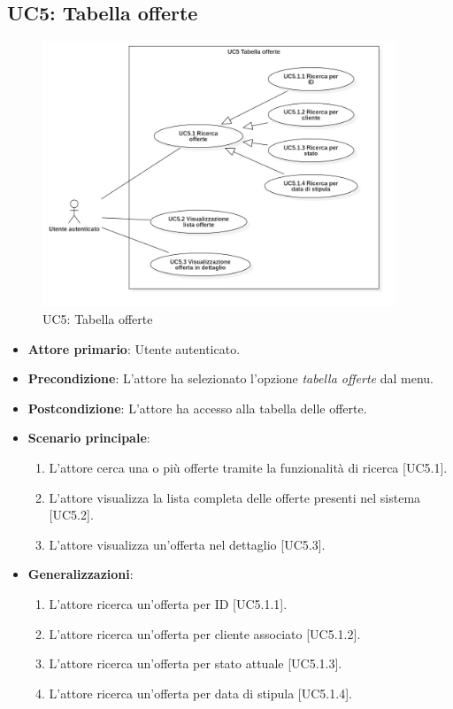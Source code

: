 \subsection{UC5: Tabella offerte}
\begin{figure}[!h]
\centering
\includegraphics[width=400px]{../images/UC/.jpeg/UC5.0-tabellaOfferte.jpg}
\caption{UC5: Tabella offerte}
\end{figure}

\begin{itemize}
\item \textbf{Attore primario}: Utente autenticato.
\item \textbf{Precondizione}: L'attore ha selezionato l'opzione \textit{tabella offerte} dal menu.
\item \textbf{Postcondizione}: L'attore ha accesso alla tabella delle offerte.
\item \textbf{Scenario principale}: 
\begin{enumerate}
\item L'attore cerca una o più offerte tramite la funzionalità di ricerca [UC5.1].
\item L'attore visualizza la lista completa delle offerte presenti nel sistema [UC5.2].
\item L'attore visualizza un'offerta nel dettaglio [UC5.3].
\end{enumerate}
\item \textbf{Generalizzazioni}:
\begin{enumerate}
\item L'attore ricerca un'offerta per ID [UC5.1.1].
\item L'attore ricerca un'offerta per cliente associato [UC5.1.2].
\item L'attore ricerca un'offerta per stato attuale [UC5.1.3].
\item L'attore ricerca un'offerta per data di stipula [UC5.1.4].
\end{enumerate}
\end{itemize}

